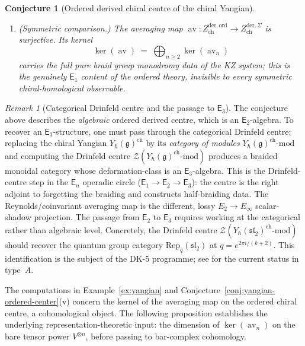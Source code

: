 \documentclass[11pt,reqno]{amsart}
\newtheorem{conjecture}[theorem]{Conjecture}
\theoremstyle{definition}
\theoremstyle{remark}
\newtheorem{remark}[theorem]{Remark}
\newcommand{\cZ}{\mathcal{Z}}
\newcommand{\Eone}{\mathsf{E}_{1}}
\newcommand{\Etwo}{\mathsf{E}_{2}}
\providecommand{\Ethree}{\mathsf{E}_{3}}
\newcommand{\En}{\mathsf{E}_{n}}
\DeclareMathOperator{\av}{av}
\newcommand{\fg}{\mathfrak{g}}
\numberwithin{equation}{section}
\begin{document}
\begin{conjecture}[Ordered derived chiral centre of the
chiral Yangian]
\begin{enumerate}[label=\textup{(\roman*)}]
\item \textup{(Symmetric comparison.)}
  The averaging map $\av \colon
  Z^{\mathrm{der,ord}}_{\mathrm{ch}} \to
  Z^{\mathrm{der,}\Sigma}_{\mathrm{ch}}$ is surjective.
  Its kernel
  \[
    \ker(\av)
    \;=\; \bigoplus_{n \geq 2} \ker(\av_n)
  \]
  carries the full pure braid group monodromy data of
  the KZ system; this is the genuinely $\Eone$ content
  of the ordered theory, invisible to every symmetric
  chiral-homological observable.
\end{enumerate}
\end{conjecture}

\begin{remark}[Categorical Drinfeld centre and
the passage to $\Ethree$]
\label{rem:yangian-ordered-center-categorical}
The conjecture above describes the \emph{algebraic}
ordered derived centre, which is an $\Etwo$-algebra.
To recover an $\Ethree$-structure, one must pass through
the categorical Drinfeld centre: replacing the chiral
Yangian $Y_\hbar(\fg)^{\mathrm{ch}}$ by its
\emph{category of modules}
$Y_\hbar(\fg)^{\mathrm{ch}}\textrm{-mod}$ and computing
the Drinfeld centre
$\cZ(Y_\hbar(\fg)^{\mathrm{ch}}\textrm{-mod})$
produces a braided monoidal category whose
deformation-class is an $\Ethree$-algebra.
This is the Drinfeld-centre step in the $\En$ operadic circle
($\Eone \to \Etwo \to \Ethree$): the centre is the
right adjoint to forgetting the braiding and constructs
half-braiding data. The Reynolds/coinvariant averaging map is the
different, lossy $E_2\to E_\infty$ scalar-shadow projection.
The passage from $\Etwo$ to $\Ethree$ requires working at the
categorical rather than algebraic level. Concretely, the Drinfeld centre
$\cZ(Y_\hbar(\mathfrak{sl}_2)^{\mathrm{ch}}\textrm{-mod})$
should recover the quantum group category
$\mathrm{Rep}_q(\mathfrak{sl}_2)$ at
$q = e^{2\pi i/(k+2)}$. This identification is the
subject of the DK-5 programme; see
\cite[\S6]{Lorgat26I} for the current status in type~$A$.
\end{remark}

The computations in
Example~\ref{ex:yangian} and
Conjecture~\ref{conj:yangian-ordered-center}(v)
concern the kernel of the averaging map on the
ordered chiral centre, a cohomological object.
The following proposition establishes the underlying
representation-theoretic input: the dimension of
$\ker(\av_n)$ on the bare tensor power $V^{\otimes n}$,
before passing to bar-complex cohomology.
\end{document}
